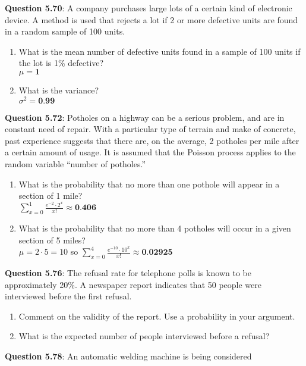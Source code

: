 \documentclass{article}
\begin{document}
    \textbf{Question 5.70}: A company purchases large lots of a certain kind
    of electronic device. A method is used that rejects a
    lot if 2 or more defective units are found in a random
    sample of 100 units.
        \begin{enumerate}[label = (\alph*)]
            \item What is the mean number of defective units found
            in a sample of 100 units if the lot is 1\% defective?\\
                $\mu = \textbf{1}$
            \item What is the variance?\\
                $\sigma^2 = \textbf{0.99}$
        \end{enumerate}
    \textbf{Question 5.72}:  Potholes on a highway can be a serious problem,
    and are in constant need of repair. With a particular
    type of terrain and make of concrete, past experience
    suggests that there are, on the average, 2 potholes per
    mile after a certain amount of usage. It is assumed
    that the Poisson process applies to the random variable 
    “number of potholes.”
        \begin{enumerate}[label = (\alph*)]
            \item What is the probability that no more than one pothole will appear in a section of 1 mile?\\
            $\sum_{x=0}^{1}\frac{e^{-2}\cdot 2^x}{x!} \approx \textbf{0.406}$
            \item What is the probability that no more than 4 potholes will occur in a given section of 5 miles?\\
            $\mu = 2\cdot 5 = 10$ so $\sum_{x=0}^{4}\frac{e^{-10}\cdot 10^x}{x!} \approx \textbf{0.02925}$
        \end{enumerate}
    \textbf{Question 5.76}: The refusal rate for telephone polls is known to
    be approximately 20\%. A newspaper report indicates
    that 50 people were interviewed before the first refusal.
        \begin{enumerate}[label = (\alph*)]
            \item Comment on the validity of the report. Use a probability 
            in your argument.
            \item What is the expected number of people interviewed
            before a refusal?
        \end{enumerate}
    \textbf{Question 5.78}: An automatic welding machine is being considered
\end{document}
